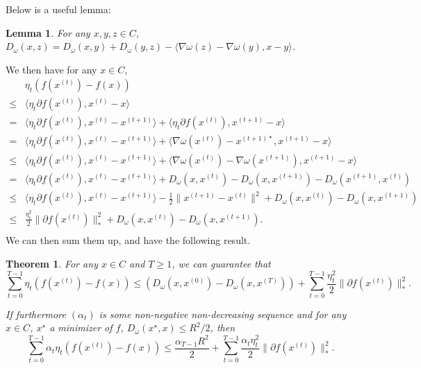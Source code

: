 \documentclass[openany]{book}
\newtheorem{lemma}{Lemma}[chapter]
\newtheorem{theorem}{Theorem}[chapter]
\theoremstyle{definition}
\theoremstyle{remark}
\begin{document}
Below is a useful lemma:
\begin{lemma}
    For any $x,y,z\in C$, $D_{\omega}(x,z)=D_{\omega}(x,y)+D_{\omega}(y,z)-\langle\nabla\omega(z)-\nabla\omega(y),x-y\rangle$.
\end{lemma}
We then have for any $x\in C$,
\begin{equation*}
    \begin{split}
         & \eta_t\left(f(x^{(t)})-f(x)\right) \\
        \le & \langle\eta_t\partial f(x^{(t)}),x^{(t)}-x\rangle \\
        = & \langle\eta_t\partial f(x^{(t)}),x^{(t)}-x^{(t+1)}\rangle+\langle\eta_t\partial f(x^{(t)}),x^{(t+1)}-x\rangle \\
        = & \langle\eta_t\partial f(x^{(t)}),x^{(t)}-x^{(t+1)}\rangle+\langle\nabla\omega(x^{(t)})-x^{(t+1)*},x^{(t+1)}-x\rangle \\
        \le & \langle\eta_t\partial f(x^{(t)}),x^{(t)}-x^{(t+1)}\rangle+\langle\nabla\omega(x^{(t)})-\nabla\omega(x^{(t+1)}),x^{(t+1)}-x\rangle \\
        = & \langle\eta_t\partial f(x^{(t)}),x^{(t)}-x^{(t+1)}\rangle+D_{\omega}(x,x^{(t)})-D_{\omega}(x,x^{(t+1)})-D_{\omega}(x^{(t+1)},x^{(t)}) \\
        \le & \langle\eta_t\partial f(x^{(t)}),x^{(t)}-x^{(t+1)}\rangle-\frac{1}{2}\|x^{(t+1)}-x^{(t)}\|^2+D_{\omega}(x,x^{(t)})-D_{\omega}(x,x^{(t+1)}) \\
        \le & \frac{\eta_t^2}{2}\|\partial f(x^{(t)})\|_*^2+D_{\omega}(x,x^{(t)})-D_{\omega}(x,x^{(t+1)}). \\
    \end{split}
\end{equation*}
We can then sum them up, and have the following result.
\begin{theorem}\label{thm:MDGuarantee}
    For any $x\in C$ and $T\ge1$, we can guarantee that
    \begin{equation*}
        \sum_{t=0}^{T-1}\eta_t\left(f(x^{(t)})-f(x)\right)\le\left(D_{\omega}(x,x^{(0)})-D_{\omega}(x,x^{(T)})\right)+\sum_{t=0}^{T-1}\frac{\eta_t^2}{2}\|\partial f(x^{(t)})\|_*^2.
    \end{equation*}

    If furthermore $(\alpha_t)$ is some non-negative non-decreasing sequence and for any $x\in C$, $x^{\star}$ a minimizer of $f$, $D_{\omega}(x^{\star},x)\le R^2/2$, then
    \begin{equation*}
        \sum_{t=0}^{T-1}\alpha_t\eta_t\left(f(x^{(t)})-f(x)\right)\le \frac{\alpha_{T-1}R^2}{2}+\sum_{t=0}^{T-1}\frac{\alpha_t\eta_t^2}{2}\|\partial f(x^{(t)})\|_*^2.
    \end{equation*}
\end{theorem}
\end{document}
